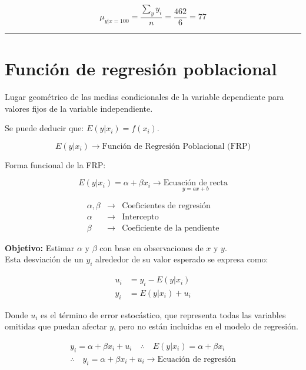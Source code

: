 \documentclass[
]{book}
\begin{document}
\[
\mu_{y|x=100} = \frac{\sum_{y}y_{i}}{n} = \frac{462}{6} = 77
\]

\begin{center}\rule{0.5\linewidth}{0.5pt}\end{center}

\hypertarget{funciuxf3n-de-regresiuxf3n-poblacional}{%
\section{Función de regresión poblacional}\label{funciuxf3n-de-regresiuxf3n-poblacional}}

Lugar geométrico de las medias condicionales de la variable dependiente para valores fijos de la variable independiente.

Se puede deducir que: \(E(y|x_i) = f(x_i)\).

\[
E(y|x_i) \rightarrow \text{Función de Regresión Poblacional (FRP)}
\]

Forma funcional de la FRP:

\[
E(y|x_i) = \alpha + \beta x_i \rightarrow \underset{y = ax+b}{\text{Ecuación de recta}}
\]

\[
\begin{array}{ccc} 
\alpha, \beta & \rightarrow & \text{Coeficientes de regresión} \\
\alpha & \rightarrow & \text{Intercepto} \\
\beta & \rightarrow & \text{Coeficiente de la pendiente}
\end{array}
\]

\textbf{Objetivo:} Estimar \(\alpha\) y \(\beta\) con base en observaciones de \(x\) y \(y\).\\
Esta desviación de un \(y_i\) alrededor de su valor esperado se expresa como:

\[
\begin{aligned}
u_i &= y_i - E(y|x_i) \\
y_i &= E(y|x_i) + u_i
\end{aligned}
\]

Donde \(u_i\) es el término de error estocástico, que representa todas las variables omitidas que puedan afectar \(y\), pero no están incluidas en el modelo de regresión.

\[
\begin{aligned}
y_i = \alpha + \beta x_i + u_i \quad \therefore \quad E(y|x_i) = \alpha + \beta x_i \\
\therefore \quad y_i = \alpha + \beta x_i + u_i \rightarrow \text{Ecuación de regresión}
\end{aligned}
\]
\end{document}

